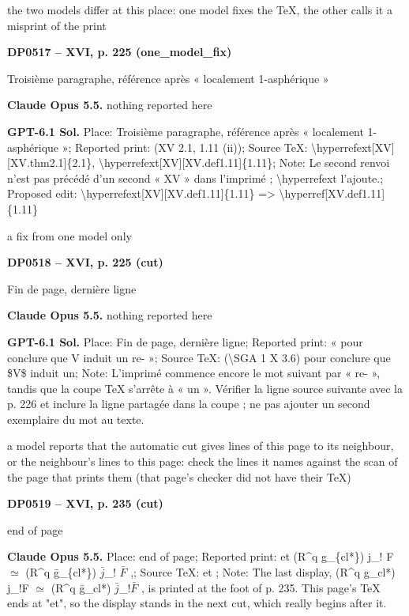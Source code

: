 the two models differ at this place: one model fixes the TeX, the other calls it a misprint of the print\par
\par\noindent\hypertarget{DP0517}{}\textbf{DP0517 -- XVI, p. 225 (one\_model\_fix)}\par
Troisième paragraphe, référence après « localement 1-asphérique »\par
\textbf{Claude Opus 5.5.} nothing reported here\par
\textbf{GPT-6.1 Sol.} Place: Troisième paragraphe, référence après « localement 1-asphérique »; Reported print: (XV 2.1, 1.11 (ii)); Source TeX: \textbackslash{}hyperrefext[XV][XV.thm2.1]\{2.1\}, \textbackslash{}hyperrefext[XV][XV.def1.11]\{1.11\}; Note: Le second renvoi n'est pas précédé d'un second « XV » dans l'imprimé ; \textbackslash{}hyperrefext l'ajoute.; Proposed edit: \textbackslash{}hyperrefext[XV][XV.def1.11]\{1.11\} =\allowbreak > \textbackslash{}hyperref[XV.def1.11]\{1.11\}\par
a fix from one model only\par
\par\noindent\hypertarget{DP0518}{}\textbf{DP0518 -- XVI, p. 225 (cut)}\par
Fin de page, dernière ligne\par
\textbf{Claude Opus 5.5.} nothing reported here\par
\textbf{GPT-6.1 Sol.} Place: Fin de page, dernière ligne; Reported print: « pour conclure que V induit un re- »; Source TeX: (\textbackslash{}SGA 1 X 3.6) pour conclure que \$V\$ induit un; Note: L'imprimé commence encore le mot suivant par « re- », tandis que la coupe TeX s'arrête à « un ». Vérifier la ligne source suivante avec la p. 226 et inclure la ligne partagée dans la coupe ; ne pas ajouter un second exemplaire du mot au texte.\par
a model reports that the automatic cut gives lines of this page to its neighbour, or the neighbour's lines to this page: check the lines it names against the scan of the page that prints them (that page's checker did not have their TeX)\par
\par\noindent\hypertarget{DP0519}{}\textbf{DP0519 -- XVI, p. 235 (cut)}\par
end of page\par
\textbf{Claude Opus 5.5.} Place: end of page; Reported print: et (R\textasciicircum{}q g\_\{cl*\}) j\_! F \ensuremath{\simeq} (R\textasciicircum{}q ḡ\_\{cl*\}) \ensuremath{\bar{j}}\_! \ensuremath{\bar{F}} ,; Source TeX: et  ; Note: The last display, (R\textasciicircum{}q g\_cl*) j\_!F \ensuremath{\simeq} (R\textasciicircum{}q ḡ\_cl*) \ensuremath{\bar{j}}\_!\ensuremath{\bar{F}} , is printed at the foot of p. 235. This page's TeX ends at "et", so the display stands in the next cut, which really begins after it.\par
